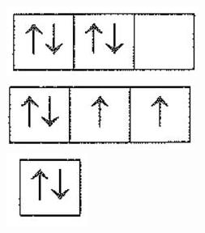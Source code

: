 \documentclass[10pt]{article}
\begin{document}
\includegraphics[max width=\textwidth, center]{2025_10_23_76620c17ffac1ae9b35bg-12(11)}\\
\includegraphics[max width=\textwidth, center]{2025_10_23_76620c17ffac1ae9b35bg-12(13)}\\
\includegraphics[max width=\textwidth, center]{2025_10_23_76620c17ffac1ae9b35bg-12(8)}\\
\end{document}
